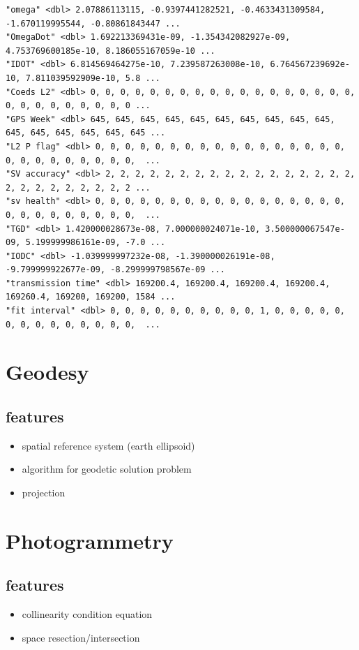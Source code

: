 \documentclass[9pt,a4paper,onecolumn,oneside]{rho-class/rho}
\begin{document}
\begin{verbatim}
"omega" <dbl> 2.07886113115, -0.9397441282521, -0.4633431309584, -1.670119995544, -0.80861843447 ...
"OmegaDot" <dbl> 1.692213369431e-09, -1.354342082927e-09, 4.753769600185e-10, 8.186055167059e-10 ...
"IDOT" <dbl> 6.814569464275e-10, 7.239587263008e-10, 6.764567239692e-10, 7.811039592909e-10, 5.8 ...
"Coeds L2" <dbl> 0, 0, 0, 0, 0, 0, 0, 0, 0, 0, 0, 0, 0, 0, 0, 0, 0, 0, 0, 0, 0, 0, 0, 0, 0, 0, 0 ...
"GPS Week" <dbl> 645, 645, 645, 645, 645, 645, 645, 645, 645, 645, 645, 645, 645, 645, 645, 645 ...
"L2 P flag" <dbl> 0, 0, 0, 0, 0, 0, 0, 0, 0, 0, 0, 0, 0, 0, 0, 0, 0, 0, 0, 0, 0, 0, 0, 0, 0, 0,  ...
"SV accuracy" <dbl> 2, 2, 2, 2, 2, 2, 2, 2, 2, 2, 2, 2, 2, 2, 2, 2, 2, 2, 2, 2, 2, 2, 2, 2, 2, 2 ...
"sv health" <dbl> 0, 0, 0, 0, 0, 0, 0, 0, 0, 0, 0, 0, 0, 0, 0, 0, 0, 0, 0, 0, 0, 0, 0, 0, 0, 0,  ...
"TGD" <dbl> 1.420000028673e-08, 7.000000024071e-10, 3.500000067547e-09, 5.199999986161e-09, -7.0 ...
"IODC" <dbl> -1.039999997232e-08, -1.390000026191e-08, -9.799999922677e-09, -8.299999798567e-09 ...
"transmission time" <dbl> 169200.4, 169200.4, 169200.4, 169200.4, 169260.4, 169200, 169200, 1584 ...
"fit interval" <dbl> 0, 0, 0, 0, 0, 0, 0, 0, 0, 0, 1, 0, 0, 0, 0, 0, 0, 0, 0, 0, 0, 0, 0, 0, 0,  ...
\end{verbatim}

\section{Geodesy}

\subsection{features}
\begin{itemize}
    \item spatial reference system (earth ellipsoid)
    \item algorithm for geodetic solution problem
    \item projection
\end{itemize}

\section{Photogrammetry}

\subsection{features}
\begin{itemize}
    \item collinearity condition equation
    \item space resection/intersection
\end{itemize}
\end{document}
